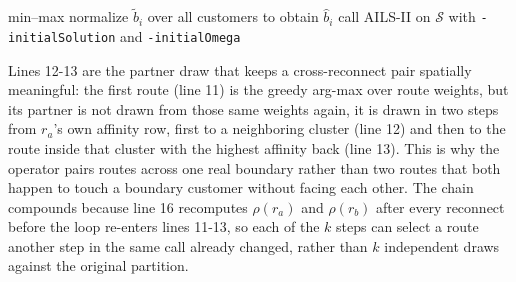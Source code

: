 \begin{algorithm}[H]
\DontPrintSemicolon
\LinesNumbered
{}
min--max normalize $\tilde b_i$ over all customers to obtain $\hat b_i$\;
call AILS-II on $\mathcal{S}$ with \texttt{-initialSolution} and \texttt{-initialOmega}\;
\caption{BG-AILS: boundary-guided perturbation preceding the AILS-II call}
\label{alg:bgails}
\end{algorithm}

Lines 12-13 are the partner draw that keeps a cross-reconnect pair spatially meaningful: the first route (line 11) is the greedy arg-max over route weights, but its partner is not drawn from those same weights again, it is drawn in two steps from $r_a$'s own affinity row, first to a neighboring cluster (line 12) and then to the route inside that cluster with the highest affinity back (line 13). This is why the operator pairs routes across one real boundary rather than two routes that both happen to touch a boundary customer without facing each other. The chain compounds because line 16 recomputes $\rho(r_a)$ and $\rho(r_b)$ after every reconnect before the loop re-enters lines 11-13, so each of the $k$ steps can select a route another step in the same call already changed, rather than $k$ independent draws against the original partition.

